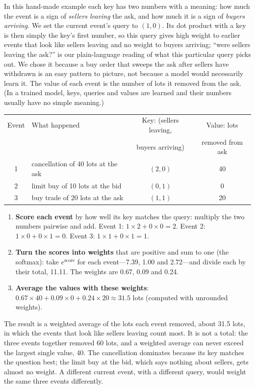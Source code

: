 In this hand-made example each key has two numbers with a meaning: how much the event is a sign of
\emph{sellers leaving} the ask, and how much it is a sign of \emph{buyers arriving}. We set the current event's query
to $(1, 0)$. Its dot product with a key is then simply the key's first number, so this query gives high weight to
earlier events that look like sellers leaving and no weight to buyers arriving; ``were sellers leaving the ask?''
is our plain-language reading of what this particular query picks out. We chose it because a buy order that sweeps
the ask after sellers have withdrawn is an easy pattern to picture, not because a model would necessarily learn it. The value
of each event is the number of lots it removed from the ask. (In a trained model, keys, queries and values are
learned and their numbers usually have no simple meaning.)

\begin{center}
\footnotesize
\begin{tabular}{clcc}
\toprule
Event & What happened & Key: (sellers leaving, & Value: lots \\
      &               & buyers arriving)      & removed from ask \\
\midrule
1 & cancellation of 40 lots at the ask & $(2, 0)$ & 40 \\
2 & limit buy of 10 lots at the bid & $(0, 1)$ & 0 \\
3 & buy trade of 20 lots at the ask & $(1, 1)$ & 20 \\
\bottomrule
\end{tabular}
\end{center}

\begin{enumerate}[leftmargin=1.8em,itemsep=2pt]
\item \textbf{Score each event} by how well its key matches the query: multiply the two numbers pairwise and add.
  Event 1: $1 \times 2 + 0 \times 0 = 2$. Event 2: $1 \times 0 + 0 \times 1 = 0$. Event 3: $1 \times 1 + 0 \times 1 = 1$.
\item \textbf{Turn the scores into weights} that are positive and sum to one (the softmax): take $e^{\text{score}}$
  for each event---7.39, 1.00 and 2.72---and divide each by their total, 11.11. The weights are 0.67, 0.09 and 0.24.
\item \textbf{Average the values with these weights}: $0.67 \times 40 + 0.09 \times 0 + 0.24 \times 20 \approx 31.5$
  lots (computed with unrounded weights).
\end{enumerate}
The result is a weighted average of the lots each event removed, about 31.5 lots, in which the events
that look like sellers leaving count most. It is not a total: the three events together removed 60 lots, and a
weighted average can never exceed the largest single value, 40. The cancellation dominates because its key matches the question best; the limit buy
at the bid, which says nothing about sellers, gets almost no weight. A different current event, with a different
query, would weight the same three events differently.

